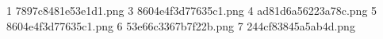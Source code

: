 1 7897c8481e53e1d1.png
3 8604e4f3d77635c1.png
4 ad81d6a56223a78c.png
5 8604e4f3d77635c1.png
6 53e66c3367b7f22b.png
7 244cf83845a5ab4d.png
